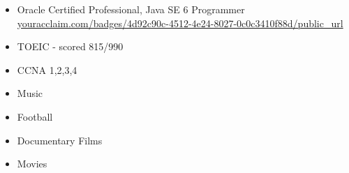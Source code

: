 \begin{itemize}
\item Oracle Certified Professional, Java SE 6 Programmer \url{youracclaim.com/badges/4d92c90c-4512-4e24-8027-0c0c3410f88d/public_url} 
\item TOEIC - scored 815/990
\item CCNA 1,2,3,4
\end{itemize}








\begin{itemize}
\item Music 
\item Football
\item Documentary Films
\item Movies
\end{itemize}